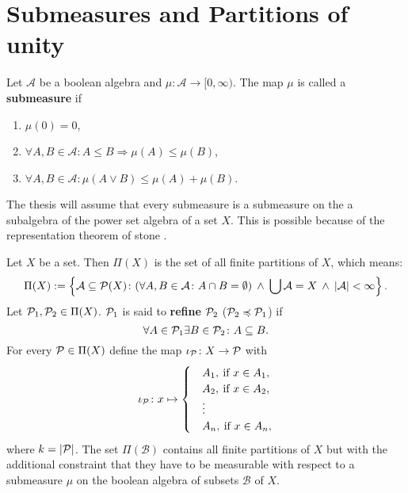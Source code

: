 \section{Submeasures and Partitions of unity}

\begin{defin}
  Let $\mathcal{A}$ be a boolean algebra and $\mu\colon \mathcal{A} \to [0, \infty)$. The map $\mu$ is called a \textbf{submeasure} if
  \begin{enumerate}
    \item $\mu(0) = 0$,
    \item $\forall A, B \in \mathcal{A}\colon A \leq B \Rightarrow \mu(A) \leq \mu(B)$,
    \item $\forall A, B \in \mathcal{A}\colon \mu(A \lor B) \leq \mu(A) + \mu(B)$.
  \end{enumerate}
\end{defin}

The thesis will assume that every submeasure is a submeasure on the a subalgebra of the power set algebra of a set $X$. This is possible because of the representation theorem of stone \cite{stone}.

\begin{defin}
  Let $X$ be a set. Then $\Pi(X)$ is the set of all finite partitions of $X$, which means:
  \begin{equation*}
    \Pi(X) := \left\{ \mathcal{A} \subseteq \P(X)\colon (\forall A,B \in \mathcal{A}\colon A \cap B = \emptyset) \: \land \: \bigcup\mathcal{A} = X \: \land \: \left| \mathcal{A} \right| < \infty \right\}.
  \end{equation*}
  Let $\P_1, \P_2 \in \Pi(X)$. $\P_1$ is said to \textbf{refine} $\P_2$ ($\P_2 \preccurlyeq \P_1$) if
  \begin{equation*}
    \forall A \in \P_1\exists B \in \P_2\colon A \subseteq B.
  \end{equation*}
  For every $\P \in \Pi(X)$ define the map $\iota_\P\colon X \to \P$ with
  \begin{equation*}
    \iota_\P\colon x \mapsto \begin{cases}
      &A_1, \: \text{if } x \in A_1, \\
      &A_2, \: \text{if } x \in A_2, \\
      &\vdots \\
      &A_n, \: \text{if } x \in A_n,
    \end{cases}
  \end{equation*}
  where $k = \left|\P\right|$.    
  The set $\Pi(\mathcal{B})$ contains all finite partitions of $X$ but with the additional constraint that they have to be measurable with respect to a submeasure $\mu$ on the boolean algebra of subsets $\mathcal{B}$ of $X$. 
\end{defin}

